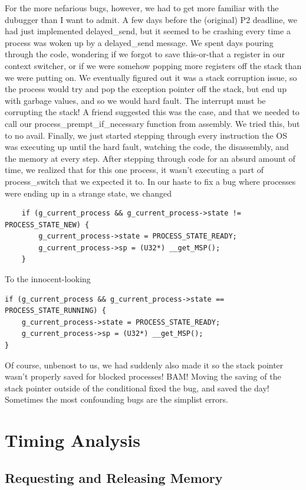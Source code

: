 \documentclass[12pt]{report}
\begin{document}
For the more nefarious bugs, however, we had to get more familiar with the dubugger than I want to admit. A few days before the (original) P2 deadline, we had just implemented delayed\_send, but it seemed to be crashing every time a process was woken up by a delayed\_send message. We spent days pouring through the code, wondering if we forgot to save this-or-that a register in our context switcher, or if we were somehow popping more registers off the stack than we were putting on. We eventually figured out it was a stack corruption issue, so the process would try and pop the exception pointer off the stack, but end up with garbage values, and so we would hard fault. The interrupt must be corrupting the stack! A friend suggested this was the case, and that we needed to call our process\_prempt\_if\_necessary function from assembly. We tried this, but to no avail. Finally, we just started stepping through every instruction the OS was executing up until the hard fault, watching the code, the disassembly, and the memory at every step. After stepping through code for an absurd amount of time, we realized that for this one process, it wasn't executing a part of process\_switch that we expected it to. In our haste to fix a bug where processes were ending up in a strange state, we changed
\begin{lstlisting}
	if (g_current_process && g_current_process->state != PROCESS_STATE_NEW) {
		g_current_process->state = PROCESS_STATE_READY;
		g_current_process->sp = (U32*) __get_MSP();
	}
\end{lstlisting}
To the innocent-looking
\begin{lstlisting}
if (g_current_process && g_current_process->state == PROCESS_STATE_RUNNING) {
	g_current_process->state = PROCESS_STATE_READY;
	g_current_process->sp = (U32*) __get_MSP();
}
\end{lstlisting}
Of course, unbenost to us, we had suddenly also made it so the stack pointer
wasn't properly saved for blocked processes! BAM! Moving the saving of the stack pointer outside of the conditional fixed the bug, and saved the day! Sometimes the most confounding bugs are the simplist errors.


\chapter{Timing Analysis}

\section{Requesting and Releasing Memory}
\end{document}
